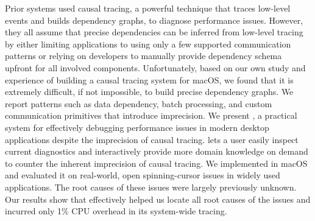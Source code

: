 Prior systems used causal tracing, a powerful technique that traces low-level
events and builds dependency graphs, to diagnose performance issues.  However,
they all assume that precise dependencies can be inferred from low-level
tracing by either limiting applications to using only a few supported
communication patterns or relying on developers to manually provide dependency
schema upfront for all involved components.  Unfortunately, based on our own
study and experience of building a causal tracing system for macOS, we found
that it is extremely difficult, if not impossible, to build precise dependency
graphs.  We report patterns such as data dependency, batch processing, and
custom communication primitives that introduce imprecision.  We present \xxx, a
practical system for effectively debugging performance issues in modern desktop
applications despite the imprecision of causal tracing.  \xxx lets a user
easily inspect current diagnostics and interactively provide more domain
knowledge on demand to counter the inherent imprecision of causal tracing.  We
implemented \xxx in macOS and evaluated it on \nbug real-world, open
spinning-cursor issues in widely used applications.  The root causes of these
issues were largely previously unknown.  Our results show that \xxx effectively
helped us locate all root causes of the issues and incurred only 1\% CPU
overhead in its system-wide tracing.
